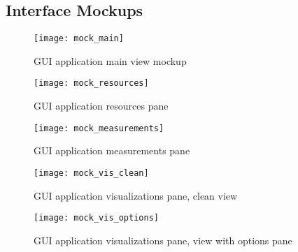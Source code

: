 \subsection{Interface Mockups}

\begin{figure}[h]
  \centering
  \texttt{[image: mock\_main]}
  \caption{GUI application main view mockup}
  \label{fig:arch_overall}
\end{figure}


\begin{figure}[h]
  \centering
  \texttt{[image: mock\_resources]}
  \caption{GUI application resources pane}
  \label{fig:arch_overall}
\end{figure}

\begin{figure}[h]
  \centering
  \texttt{[image: mock\_measurements]}
  \caption{GUI application measurements pane}
  \label{fig:arch_overall}
\end{figure}

\begin{figure}[h]
  \centering
  \texttt{[image: mock\_vis\_clean]}
  \caption{GUI application visualizations pane, clean view}
  \label{fig:arch_overall}
\end{figure}

\begin{figure}[h]
  \centering
  \texttt{[image: mock\_vis\_options]}
  \caption{GUI application visualizations pane, view with options pane}
  \label{fig:arch_overall}
\end{figure}

